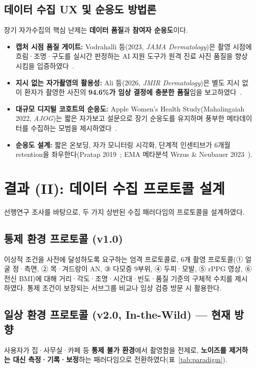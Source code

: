 \documentclass[11pt,a4paper]{article}
\begin{document}
\subsection{데이터 수집 UX 및 순응도 방법론}
장기 자가수집의 핵심 난제는 \textbf{데이터 품질}과 \textbf{참여자 순응도}이다.
\begin{itemize}
  \item \textbf{캡처 시점 품질 게이트:} Vodrahalli 등(2023, \emph{JAMA Dermatology})은 촬영 시점에 흐림·조명·구도를 실시간 판정하는 AI 지원 도구가 원격 진료 사진 품질을 향상시킴을 입증하였다~\cite{ref11}.
  \item \textbf{지시 없는 자가촬영의 활용성:} Ali 등(2026, \emph{JMIR Dermatology})은 별도 지시 없이 환자가 촬영한 사진의 \textbf{94.6\%가 임상 결정에 충분한 품질}임을 보고하였다~\cite{ref12}.
  \item \textbf{대규모 디지털 코호트의 순응도:} Apple Women's Health Study(Mahalingaiah 2022, \emph{AJOG})는 짧은 자가보고 설문으로 장기 순응도를 유지하며 풍부한 메타데이터를 수집하는 모범을 제시하였다~\cite{ref13}.
  \item \textbf{순응도 설계:} 짧은 온보딩, 자가 모니터링 시각화, 단계적 인센티브가 6개월 retention을 좌우한다(Pratap 2019~\cite{ref14}; EMA 메타분석 Wrzus \& Neubauer 2023~\cite{ref15}).
\end{itemize}

\section{결과 (II): 데이터 수집 프로토콜 설계}
선행연구 조사를 바탕으로, 두 가지 상반된 수집 패러다임의 프로토콜을 설계하였다.

\subsection{통제 환경 프로토콜 (v1.0)}
이상적 조건을 사전에 달성하도록 요구하는 엄격 프로토콜로, 6개 촬영 프로토콜(① 얼굴 정·측면, ② 목·겨드랑이 AN, ③ 다모증 9부위, ④ 두피·모발, ⑤ rPPG 영상, ⑥ 전신 BMI)에 대해 거리·각도·조명·시간대·빈도·품질 기준의 구체적 수치를 제시하였다. 통제 조건이 보장되는 서브그룹 비교나 임상 검증 방문 시 활용한다.

\subsection{일상 환경 프로토콜 (v2.0, In-the-Wild) --- 현재 방향}
사용자가 집·사무실·카페 등 \textbf{통제 불가 환경}에서 촬영함을 전제로, \textbf{노이즈를 제거하는 대신 측정·기록·보정}하는 패러다임으로 전환하였다(표~\ref{tab:paradigm}).
\end{document}
